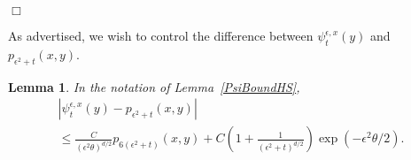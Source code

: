 \documentclass[12pt]{article}
\newenvironment {proof}{{\noindent\bf Proof }}{\hfill $\Box$ \medskip}
\newtheorem{lemma}[theorem]{Lemma}
\newcommand{\IP}{\mathbb P}
\numberwithin{equation}{section}
\begin{document}
\begin{proof}
\end{proof}

As advertised, we wish to control the difference between
$\psi_t^{\epsilon,x}(y)$
and $p_{\epsilon^2 + t}(x, y)$.

\begin{lemma}
    \label{Lemma:BoundPsiHS2}
    In the notation of Lemma~\ref{PsiBoundHS},
    \begin{multline}
\label{heat kernel estimate}
        \left|
            \psi_t^{\epsilon, x}(y)
            -
            p_{\epsilon^2 + t}(x, y)
        \right|
        \\
\le
        \frac{C}{(\epsilon^2 \theta)^{d/2}}
        p_{6(\epsilon^2+t)}(x, y)
        +
	    C \left(1+
	    \frac{1}{(\epsilon^2 + t)^{d/2}}\right)
	    \exp(- \epsilon^2 \theta / 2)
	    .
    \end{multline}
\end{lemma}
\end{document}
